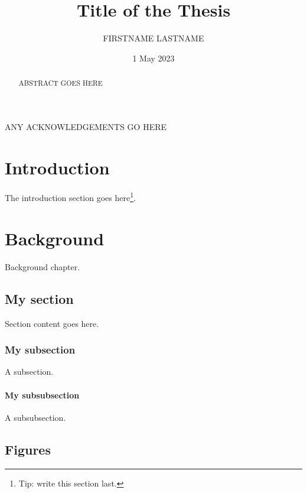 \documentclass{mldsmsc}
\title{Title of the Thesis}
\author{FIRSTNAME LASTNAME}
\date{1 May 2023}
\begin{document}
\maketitle


\declaration 


\begin{abstract}
    ABSTRACT GOES HERE
\end{abstract}

\begin{acknowledgements}
    ANY ACKNOWLEDGEMENTS GO HERE
\end{acknowledgements}


\tableofcontents

\mainmatter


\chapter{Introduction}

The introduction section goes here\footnote{Tip: write this section last.}.

\chapter{Background}

Background chapter.

\section{My section}

Section content goes here. 

\subsection{My subsection}

A subsection.

\subsubsection{My subsubsection}

A subsubsection.

\section{Figures}
\end{document}
